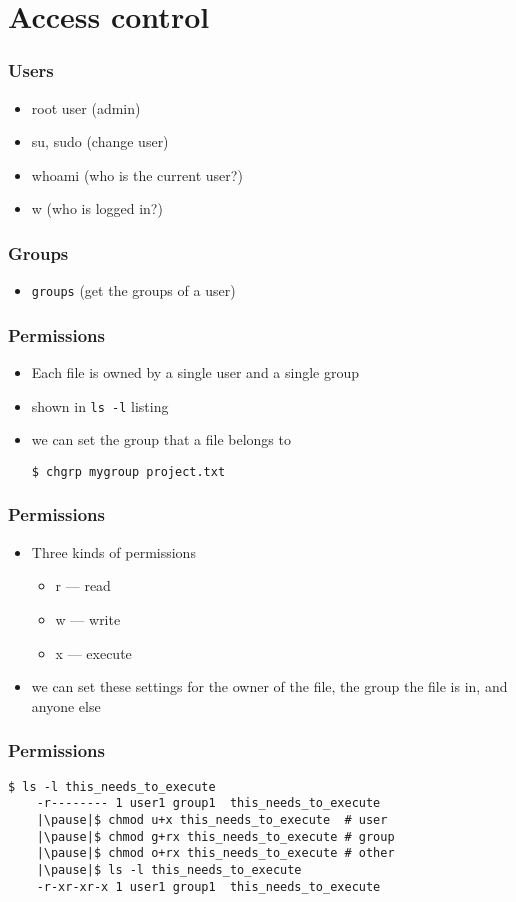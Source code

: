 \documentclass[%
        hyperref={%
                pdfauthor={Zakariyya Mughal},%
                pdfpagemode={None},pdfpagelayout={SinglePage}}%
        xcolor={x11names},%
]{beamer}
\begin{document}
\section{Access control}\frame{\insertsection}
\begin{frame}
	\frametitle{Users}
	\begin{itemize}
		\item root user (admin)
		\pause\item su, sudo (change user)
		\pause\item whoami (who is the current user?)
		\pause\item w  (who is logged in?)
	\end{itemize}
\end{frame}
\begin{frame}
	\frametitle{Groups}
	\begin{itemize}
		\item \texttt{groups} (get the groups of a user)
	\end{itemize}
\end{frame}
\begin{frame}[fragile]
	\frametitle{Permissions}
	\begin{itemize}
		\item Each file is owned by a single user and
			a single group
		\pause\item shown in \texttt{ls~-l} listing
		\pause\item we can set the group that a file belongs to
		\begin{lstlisting}[escapeinside=||]
		$ chgrp mygroup project.txt
		\end{lstlisting}
	\end{itemize}
\end{frame}
\begin{frame}
	\frametitle{Permissions}
	\begin{itemize}
		\item Three kinds of permissions
			\begin{itemize}
				\item r --- read
				\item w --- write
				\item x --- execute
			\end{itemize}
		\pause\item we can set these settings for the
			owner of the file, the group the file is
			in, and anyone else
	\end{itemize}
\end{frame}
\begin{frame}[fragile]
	\frametitle{Permissions}
	\begin{lstlisting}[escapeinside=||]
	$ ls -l this_needs_to_execute
	-r-------- 1 user1 group1  this_needs_to_execute
	|\pause|$ chmod u+x this_needs_to_execute  # user
	|\pause|$ chmod g+rx this_needs_to_execute # group
	|\pause|$ chmod o+rx this_needs_to_execute # other
	|\pause|$ ls -l this_needs_to_execute
	-r-xr-xr-x 1 user1 group1  this_needs_to_execute
	\end{lstlisting}
\end{frame}
\end{document}
